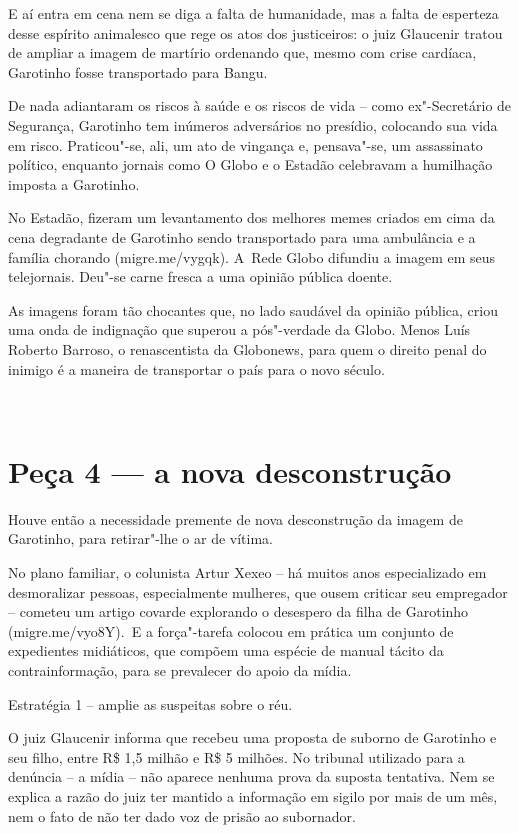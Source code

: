 E aí entra em cena nem se diga a falta de humanidade, mas a falta de
esperteza desse espírito animalesco que rege os atos dos justiceiros: o
juiz Glaucenir tratou de ampliar a imagem de martírio ordenando que,
mesmo com crise cardíaca, Garotinho fosse transportado para Bangu.

De nada adiantaram os riscos à saúde e os riscos de vida -- como
ex"-Secretário de Segurança, Garotinho tem inúmeros adversários no
presídio, colocando sua vida em risco. Praticou"-se, ali, um ato de
vingança e, pensava"-se, um assassinato político, enquanto jornais como O
Globo e o Estadão celebravam a humilhação imposta a Garotinho.

No Estadão, fizeram um levantamento dos melhores memes criados em cima
da cena degradante de Garotinho sendo transportado para uma ambulância e
a família chorando
({migre.me/\allowbreak{}vygqk)}.
A~Rede Globo difundiu a imagem em seus telejornais. Deu"-se carne fresca
a uma opinião pública doente.

As imagens foram tão chocantes que, no lado saudável da opinião pública,
criou uma onda de indignação que superou a pós"-verdade da Globo. Menos
Luís Roberto Barroso, o renascentista da Globonews, para quem o direito
penal do inimigo é a maneira de transportar o país para o novo século.

\begin{center}~\end{center}


\section{Peça 4 --- a nova desconstrução}

Houve então a necessidade premente de nova desconstrução da imagem de
Garotinho, para retirar"-lhe o ar de vítima.

No plano familiar, o colunista Artur Xexeo -- há muitos anos
especializado em desmoralizar pessoas, especialmente mulheres, que ousem
criticar seu empregador -- cometeu um artigo covarde explorando o
desespero da filha de Garotinho
({migre.me/\allowbreak{}vyo8Y)}.~E
a força"-tarefa colocou em prática um conjunto de expedientes midiáticos,
que compõem uma espécie de manual tácito da contrainformação, para se
prevalecer do apoio da mídia.

Estratégia 1 -- amplie as suspeitas sobre o réu.

O juiz Glaucenir informa que recebeu uma proposta de suborno de
Garotinho e seu filho, entre R\$ 1,5 milhão e R\$ 5 milhões. No tribunal
utilizado para a denúncia -- a mídia -- não aparece nenhuma prova da
suposta tentativa. Nem se explica a razão do juiz ter mantido a
informação em sigilo por mais de um mês, nem o fato de não ter dado voz
de prisão ao subornador.

